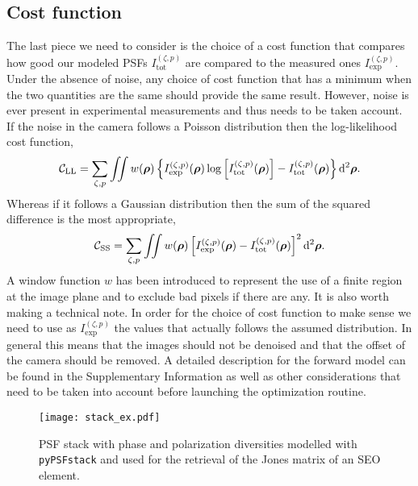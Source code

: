 \documentclass[reprint,aps,pra,superscriptaddress,
amsmath,amssymb]{revtex4-1}
\begin{document}
\subsection{Cost function}

The last piece we need to consider is the choice of a cost function that 
compares how good our modeled PSFs $I^{(\zeta ,p)}_\text{tot}$
are compared to the measured ones $I^{(\zeta ,p)}_\text{exp}$.
Under the absence of noise, any choice of cost function that has a minimum 
when the two quantities are the same should provide the same result. However,
noise is ever present in experimental measurements and thus needs to be taken
account. If the noise in the camera follows a Poisson distribution then the 
log-likelihood cost function,
\begin{align}
  \mathcal{C}_\text{LL} = \sum_{\zeta,p} \iint w(\boldsymbol \rho )\left\{ 
    I^{(\zeta ,p)}_\text{exp} (\boldsymbol \rho )
  \log \left[ I^{(\zeta ,p)}_\text{tot} (\boldsymbol \rho ) \right]
  - I^{(\zeta ,p)}_\text{tot} (\boldsymbol \rho )\right\} \mathrm{d}^2 \boldsymbol \rho.
\end{align}
Whereas if it follows a Gaussian distribution then the sum of the squared 
difference is the most appropriate,
\begin{align}
  \mathcal{C}_\text{SS} = \sum_{\zeta,p} \iint w(\boldsymbol \rho )\left[
    I^{(\zeta ,p)}_\text{exp} (\boldsymbol \rho )
  - I^{(\zeta ,p)}_\text{tot} (\boldsymbol \rho )\right]^2 \mathrm{d}^2 \boldsymbol \rho.
\end{align}
A window function $w$ has been introduced to represent the use of a finite
region at the image plane and to exclude bad pixels if there are any.
It is also worth making a technical note. In order for the choice of cost function 
to make sense we need to use as $I^{(\zeta ,p)}_\text{exp}$ the values that 
actually follows the assumed distribution. In general this means that the images
should not be denoised and that the offset of the camera should be removed.
A detailed description for the forward model can be found in the Supplementary 
Information as well as other considerations that need to be taken into account 
before launching the optimization routine. 

\begin{figure}
  \centering
  \texttt{[image: stack\_ex.pdf]}
  \caption{\label{fig:stack} PSF stack with phase and polarization diversities 
  modelled with \texttt{pyPSFstack} and used for the retrieval of the Jones
  matrix of an SEO element. }
\end{figure}
\end{document}
